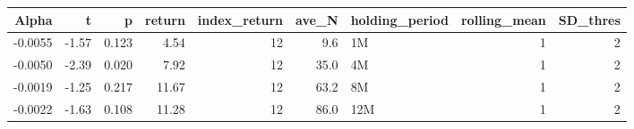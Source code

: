 \begin{table}[ht]
\centering
\begin{tabular}{rrrrrrlrr}
  \hline
Alpha & t & p & return & index\_return & ave\_N & holding\_period & rolling\_mean & SD\_thres \\ 
  \hline
-0.0055 & -1.57 & 0.123 & 4.54 & 12 & 9.6 & 1M &  1 &  2 \\ 
  -0.0050 & -2.39 & 0.020 & 7.92 & 12 & 35.0 & 4M &  1 &  2 \\ 
  -0.0019 & -1.25 & 0.217 & 11.67 & 12 & 63.2 & 8M &  1 &  2 \\ 
  -0.0022 & -1.63 & 0.108 & 11.28 & 12 & 86.0 & 12M &  1 &  2 \\ 
   \hline
\end{tabular}
\end{table}